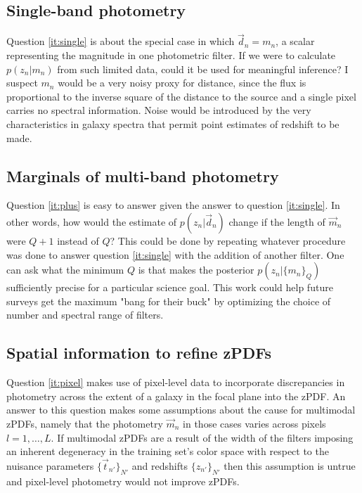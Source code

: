 \documentclass[12pt, onecolumn]{emulateapj}
\begin{document}
\subsection{Single-band photometry}

Question \ref{it:single} is about the special case in which $\vec{d}_{n}=m_{n}$, a scalar representing the magnitude in one photometric filter.  If we were to calculate $p(z_{n}|m_{n})$ from such limited data, could it be used for meaningful inference?  I suspect $m_{n}$ would be a very noisy proxy for distance, since the flux is proportional to the inverse square of the distance to the source and a single pixel carries no spectral information.  Noise would be introduced by the very characteristics in galaxy spectra that permit point estimates of redshift to be made.

\subsection{Marginals of multi-band photometry}

Question \ref{it:plus} is easy to answer given the answer to question \ref{it:single}.  In other words, how would the estimate of $p(z_{n}|\vec{d}_{n})$ change if the length of $\vec{m}_{n}$ were $Q+1$ instead of $Q$?  This could be done by repeating whatever procedure was done to answer question \ref{it:single} with the addition of another filter.  One can ask what the minimum $Q$ is that makes the posterior $p(z_{n}|\{m_{n}\}_{Q})$ sufficiently precise for a particular science goal.  This work could help future surveys get the maximum "bang for their buck" by optimizing the choice of number and spectral range of filters.

\subsection{Spatial information to refine zPDFs}

Question \ref{it:pixel} makes use of pixel-level data to incorporate discrepancies in photometry across the extent of a galaxy in the focal plane into the zPDF.  An answer to this question makes some assumptions about the cause for multimodal zPDFs, namely that the photometry $\vec{m}_{n}$ in those cases varies across pixels $l=1,\dots,L$.  If multimodal zPDFs are a result of the width of the filters imposing an inherent degeneracy in the training set's color space with respect to the nuisance parameters $\{\vec{t}_{n'}\}_{N'}$ and redshifts $\{z_{n'}\}_{N'}$ then this assumption is untrue and pixel-level photometry would not improve zPDFs.
\end{document}
